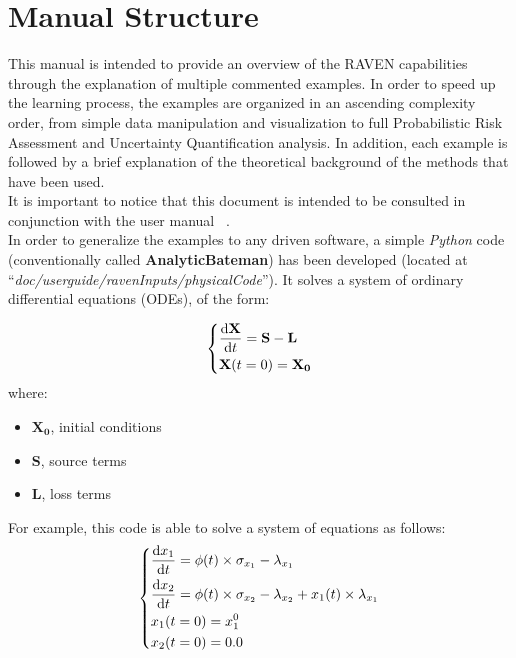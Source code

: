 \section{Manual Structure}
This manual is intended to provide an overview of the RAVEN capabilities through the explanation of multiple commented examples. 
In order to speed up the learning process, the examples are organized in an ascending complexity order, from simple data manipulation and visualization to
full Probabilistic Risk Assessment and Uncertainty Quantification analysis. In addition, each example is followed by a brief explanation of the theoretical background of the methods that have been used.
\\ It is important to notice that this document is intended to be consulted in conjunction with the user manual ~\cite{RAVENuserManual}.
\\ In order to generalize the examples to any driven software, a simple \textit{Python} code (conventionally called \textbf{AnalyticBateman}) has been developed (located at ``\textit{doc/user\textunderscore guide/ravenInputs/physicalCode}''). It solves a system of ordinary differential equations (ODEs), of the form:

\begin{equation}
\begin{dcases}
\frac{\mathrm{d} \mathbf{X}}{\mathrm{d} t} = \mathbf{S}-\mathbf{L} \\
 \mathbf{X}(t=0)= \mathbf{X_{0}}
\end{dcases}
\end{equation}
   where: 
  \begin{itemize}
     \item $\mathbf{X_{0}}$, initial conditions     
     \item $\mathbf{S}$, source terms 
     \item $\mathbf{L}$, loss terms
   \end{itemize}  

For example, this  code is able to solve a system of equations as follows:
\begin{equation}
  \begin{dcases}
   \frac{\mathrm{d} x_{1}}{\mathrm{d} t} = \phi (t)\times \sigma_{x_{1}}-\lambda_{x_{1}} \\
   \frac{\mathrm{d} x_{2}}{\mathrm{d} t} = \phi (t)\times \sigma_{x_{2}}-\lambda_{x_{2}}+x_{1}(t)\times\lambda_{x_{1}} \\
    x_{1}(t=0)= x_{1}^{0} \\
    x_{2}(t=0)= 0.0
  \end{dcases}
\end{equation}

